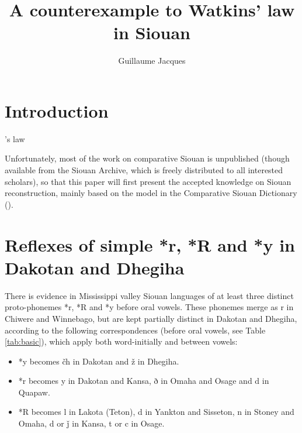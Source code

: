 \documentclass[oldfontcommands,oneside,a4paper,11pt]{article}
\newcommand{\ipa}[1]{{\phon#1}} %
\begin{document}
 

\title{A counterexample to Watkins' law in Siouan}
\author{Guillaume Jacques}
\maketitle

\section{Introduction}
 
    \citealt{watkins62celtic}'s law 
    
 


\citet{kim01venit}

Unfortunately, most of the work on comparative Siouan is unpublished (though available from the Siouan Archive, which is freely distributed to all interested scholars), so that this paper will first present the accepted knowledge on Siouan reconstruction, mainly based on the model in the Comparative Siouan Dictionary (\citealt{csd2006}).

    \citet{ullrich08}\citet{quintero10osage} 

\section{Reflexes of simple *r, *R and *y in Dakotan and Dhegiha}
There is evidence in Mississippi valley Siouan languages of at least three distinct proto-phonemes *r, *R and *y before oral vowels. These phonemes merge as \ipa{r} in Chiwere and Winnebago, but are kept partially distinct in Dakotan and Dhegiha, according to the following correspondences (before oral vowels, see Table \ref{tab:basic}), which apply both word-initially and between vowels:

\begin{itemize}
\item *y becomes \ipa{čh} in Dakotan and \ipa{ž} in Dhegiha.
\item *r becomes \ipa{y} in Dakotan and Kansa,  \ipa{ð} in Omaha and Osage and \ipa{d} in Quapaw.
\item *R becomes \ipa{l} in Lakota (Teton), \ipa{d} in Yankton and Sisseton, \ipa{n} in Stoney and Omaha, \ipa{d} or \ipa{ǰ} in Kansa, \ipa{t} or \ipa{c} in Osage.
\end{itemize}
\end{document}
